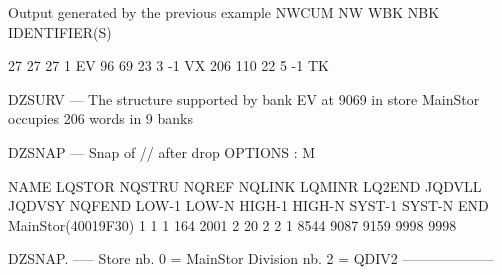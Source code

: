 \begin{Listing}{Output generated by the previous example}
  NWCUM     NW   WBK  NBK    IDENTIFIER(S)                                                                                       
                                                                                                                                 
     27     27    27    1     EV                                                                                                 
     96     69    23    3       -1 VX                                                                                            
    206    110    22    5            -1 TK                                                                                       
                                                                                                                                 
DZSURV --- The structure supported by bank EV   at       9069 in store MainStor occupies        206 words in      9 banks        
                                                                                                                                 
DZSNAP --- Snap of // after drop                                                                   OPTIONS : M                   
                                                                                                                                 
  NAME       LQSTOR NQSTRU  NQREF NQLINK LQMINR LQ2END JQDVLL JQDVSY NQFEND  LOW-1  LOW-N HIGH-1 HIGH-N SYST-1 SYST-N    END     
 MainStor(40019F30)      1      1      1    164   2001      2     20      2      2      1   8544   9087   9159   9998   9998     
                                                                                                                                 
DZSNAP.   -----  Store nb. 0 = MainStor Division nb. 2 = QDIV2                       --------------------                        
                                                                                                                                 

\end{Listing}
